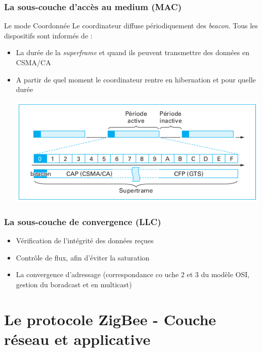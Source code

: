 \documentclass{beamer}
\begin{document}
  \begin{frame}
    \frametitle{La sous-couche d'accès au medium (MAC)}
    \begin{block}{Le mode Coordonnée}
      Le coordinateur diffuse périodiquement des \textit{beacon}. Tous les dispositifs sont informés de :
      \begin{itemize}
        \item La durée de la \textit{superframe} et quand ils peuvent transmettre des données en CSMA/CA
        \item A partir de quel moment le coordinateur rentre en hibernation et pour quelle durée
	\begin{center}
	\includegraphics[scale=0.4]{Supertrame.png}
	\end{center} 
      \end{itemize}
    \end{block}
  \end{frame}

  \begin{frame}
    \frametitle{La sous-couche de convergence (LLC)}
    \begin{itemize}
      \item Vérification de l'intégrité des données reçues
      \item Contrôle de flux, afin d'éviter la saturation
      \item La convergence d'adressage (correspondance co uche 2 et 3 du modèle OSI, gestion du boradcast et en multicast)
    \end{itemize}
  \end{frame}

  \section{Le protocole ZigBee - Couche réseau et applicative}
\end{document}
